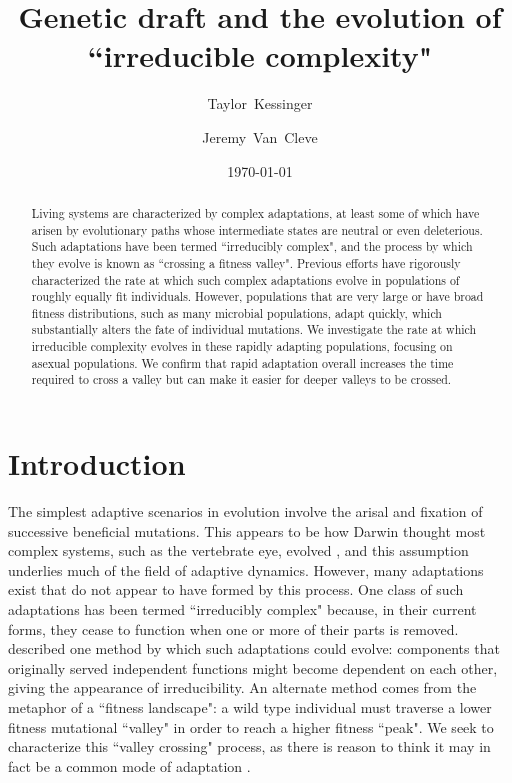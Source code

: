 \documentclass[rmp]{revtex4}
\begin{document}
\title{Genetic draft and the evolution of ``irreducible complexity"}
\author{Taylor~Kessinger}
\author{Jeremy~Van~Cleve}


\date{\today}

\begin{abstract}

Living systems are characterized by complex adaptations, at least some of which have arisen by evolutionary paths whose intermediate states are neutral or even deleterious.
Such adaptations have been termed ``irreducibly complex", and the process by which they evolve is known as ``crossing a fitness valley".
Previous efforts have rigorously characterized the rate at which such complex adaptations evolve in populations of roughly equally fit individuals.
However, populations that are very large or have broad fitness distributions, such as many microbial populations, adapt quickly, which substantially alters the fate of individual mutations.
We investigate the rate at which irreducible complexity evolves in these rapidly adapting populations, focusing on asexual populations.
We confirm that rapid adaptation overall increases the time required to cross a valley but can make it easier for deeper valleys to be crossed.
\end{abstract}

\maketitle

\section*{Introduction}

The simplest adaptive scenarios in evolution involve the arisal and fixation of successive beneficial mutations.
This appears to be how Darwin thought most complex systems, such as the vertebrate eye, evolved \citep{darwin_1859}, and this assumption underlies much of the field of adaptive dynamics.
However, many adaptations exist that do not appear to have formed by this process.
One class of such adaptations has been termed ``irreducibly complex" because, in their current forms, they cease to function when one or more of their parts is removed.
\citet{muller_1918} described one method by which such adaptations could evolve: components that originally served independent functions might become dependent on each other, giving the appearance of irreducibility.
An alternate method comes from the metaphor of a ``fitness landscape": a wild type individual must traverse a lower fitness mutational ``valley" in order to reach a higher fitness ``peak".
We seek to characterize this ``valley crossing" process, as there is reason to think it may in fact be a common mode of adaptation \citep{trotter_2014}.
\end{document}
